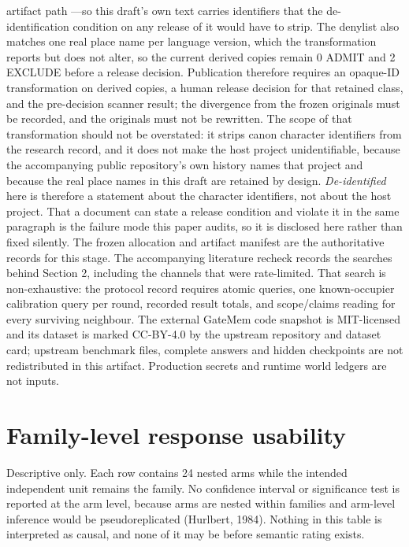 \documentclass[11pt]{article}
\begin{document}
\begin{sloppypar}
artifact path ---so this draft's own text carries identifiers that the de-identification condition on any release of it would have to strip. The denylist also matches one real place name per language version, which the transformation reports but does not alter, so the current derived copies remain 0 ADMIT and 2 EXCLUDE before a release decision. Publication therefore requires an opaque-ID transformation on derived copies, a human release decision for that retained class, and the pre-decision scanner result; the divergence from the frozen originals must be recorded, and the originals must not be rewritten. The scope of that transformation should not be overstated: it strips canon character identifiers from the research record, and it does not make the host project unidentifiable, because the accompanying public repository's own history names that project and because the real place names in this draft are retained by design. \emph{De-identified} here is therefore a statement about the character identifiers, not about the host project. That a document can state a release condition and violate it in the same paragraph is the failure mode this paper audits, so it is disclosed here rather than fixed silently. The frozen allocation and artifact manifest are the authoritative records for this stage. The accompanying literature recheck  records the searches behind Section 2, including the channels that were rate-limited. That search is non-exhaustive: the protocol record  requires atomic queries, one known-occupier calibration query per round, recorded result totals, and scope/claims reading for every surviving neighbour. The external GateMem code snapshot is MIT-licensed and its dataset is marked CC-BY-4.0 by the upstream repository and dataset card; upstream benchmark files, complete answers and hidden checkpoints are not redistributed in this artifact. Production secrets and runtime world ledgers are not inputs.
\end{sloppypar}

\section{Family-level response usability}
\label{app:family-usability}
Descriptive only. Each row contains 24 nested arms while the intended independent unit remains the family. No confidence interval or significance test is reported at the arm level, because arms are nested within families and arm-level inference would be pseudoreplicated (Hurlbert, 1984). Nothing in this table is interpreted as causal, and none of it may be before semantic rating exists.
\end{document}
